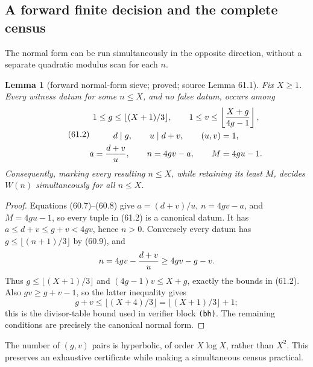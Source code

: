 \documentclass[10pt,reqno]{amsart}
\newtheorem{lemma}[theorem]{Lemma}
\theoremstyle{definition}
\newcommand{\1}{\mathbf 1}
\begin{document}
\subsection{A forward finite decision and the complete census}
The normal form can be run simultaneously in the opposite direction,
without a separate quadratic modulus scan for each $n$.

\begin{lemma}[forward normal-form sieve; proved; source Lemma 61.1]
\label{lem:forward-normal-form}
Fix $X\geq1$.  Every witness datum for some $n\leq X$, and no false datum,
occurs among
\begin{equation}\tag{61.2}
 \begin{gathered}
 1\leq g\leq\lfloor(X+1)/3\rfloor,
 \qquad 1\leq v\leq\left\lfloor {X+g\over4g-1}\right\rfloor,\\
 d\mid g,\qquad u\mid d+v,\qquad (u,v)=1,\\
 a={d+v\over u},\qquad n=4gv-a,\qquad M=4gu-1.
 \end{gathered}
\end{equation}
Consequently, marking every resulting $n\leq X$, while retaining its least
$M$, decides $W(n)$ simultaneously for all $n\leq X$.
\end{lemma}
\begin{proof}
Equations (60.7)--(60.8) give
$a=(d+v)/u$, $n=4gv-a$, and $M=4gu-1$, so every tuple in (61.2) is a
canonical datum.  It has $a\leq d+v\leq g+v<4gv$, hence $n>0$.
Conversely every datum has $g\leq\lfloor(n+1)/3\rfloor$ by (60.9), and
\[
             n=4gv-{d+v\over u}\geq4gv-g-v.
\]
Thus $g\leq\lfloor(X+1)/3\rfloor$ and
$(4g-1)v\leq X+g$, exactly the bounds in (61.2).  Also
$gv\geq g+v-1$, so the latter inequality gives
\[
 g+v\leq\lfloor(X+4)/3\rfloor
       =\lfloor(X+1)/3\rfloor+1;
\]
this is the divisor-table bound used in verifier block \texttt{(bh)}.  The
remaining conditions are precisely the canonical normal form.
\end{proof}

The number of $(g,v)$ pairs is hyperbolic, of order $X\log X$, rather than
$X^2$.  This preserves an exhaustive certificate while making a simultaneous
census practical.
\end{document}
